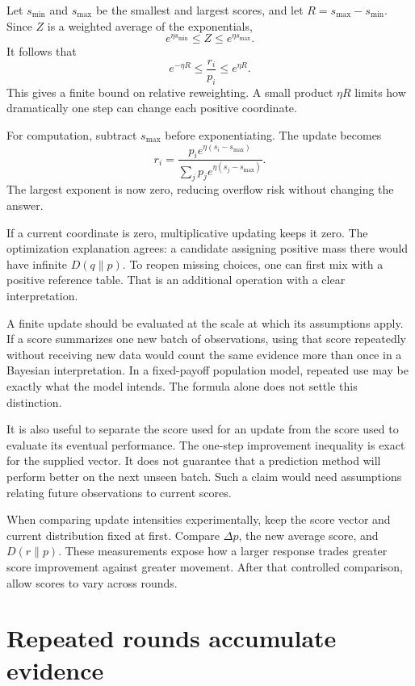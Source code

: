 \documentclass[11pt,oneside,openany]{book}
\theoremstyle{definition}
\theoremstyle{remark}
\numberwithin{equation}{chapter}
\begin{document}
Let \(s_{\min}\) and \(s_{\max}\) be the smallest and largest scores, and let \(R=s_{\max}-s_{\min}\). Since \(Z\) is a weighted average of the exponentials, \[e^{\eta s_{\min}}\leq Z\leq e^{\eta s_{\max}}.\] It follows that \[e^{-\eta R}\leq\frac{r_i}{p_i}\leq e^{\eta R}.\] This gives a finite bound on relative reweighting. A small product \(\eta R\) limits how dramatically one step can change each positive coordinate.

For computation, subtract \(s_{\max}\) before exponentiating. The update becomes \[r_i=\frac{p_i e^{\eta(s_i-s_{\max})}}
{\sum_jp_j e^{\eta(s_j-s_{\max})}}.\] The largest exponent is now zero, reducing overflow risk without changing the answer.

If a current coordinate is zero, multiplicative updating keeps it zero. The optimization explanation agrees: a candidate assigning positive mass there would have infinite \(D(q\|p)\). To reopen missing choices, one can first mix with a positive reference table. That is an additional operation with a clear interpretation.

A finite update should be evaluated at the scale at which its assumptions apply. If a score summarizes one new batch of observations, using that score repeatedly without receiving new data would count the same evidence more than once in a Bayesian interpretation. In a fixed-payoff population model, repeated use may be exactly what the model intends. The formula alone does not settle this distinction.

It is also useful to separate the score used for an update from the score used to evaluate its eventual performance. The one-step improvement inequality is exact for the supplied vector. It does not guarantee that a prediction method will perform better on the next unseen batch. Such a claim would need assumptions relating future observations to current scores.

When comparing update intensities experimentally, keep the score vector and current distribution fixed at first. Compare \(\Delta p\), the new average score, and \(D(r\|p)\). These measurements expose how a larger response trades greater score improvement against greater movement. After that controlled comparison, allow scores to vary across rounds.

\section{Repeated rounds accumulate evidence}\label{ch09-repeated-rounds-accumulate-evidence}
\end{document}
